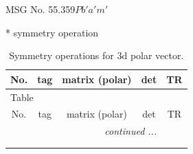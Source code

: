 \documentclass[fleqn,8pt]{jsarticle}
\begin{document}
\setcounter{MaxMatrixCols}{32}

\renewcommand{\tablename}{Table~}
\renewcommand{\figurename}{Figure~}
\begin{center}
\LARGE
MSG No. 55.359\quad$Pb'a'm'$
\end{center}
* symmetry operation
\renewcommand{\arraystretch}{1.3}
\begin{longtable}{ccccc}
\caption{Symmetry operations for 3d polar vector.}
 \\
 \hline \hline
No. & tag & matrix (polar) & det & TR \\ \hline \endfirsthead

\multicolumn{4}{l}{\tablename\ \thetable{}} \\
 \hline \hline
No. & tag & matrix (polar) & det & TR \\ \hline \endhead

 \hline \hline
\multicolumn{4}{r}{\footnotesize\it continued ...} \\ \endfoot

 \hline \hline
\multicolumn{4}{r}{} \\ \endlastfoot


\end{longtable}
\end{document}
